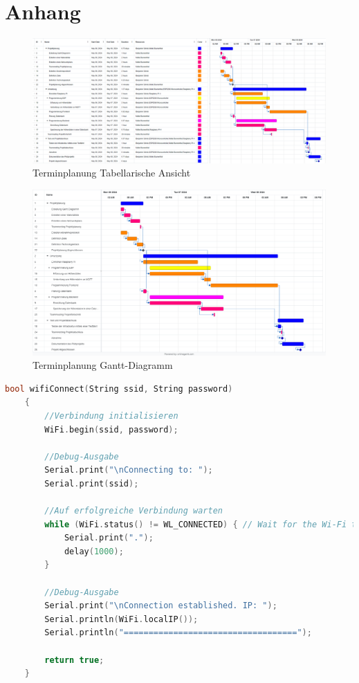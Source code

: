 \chapter{Anhang}

\begin{figure} [H]
	\centering
	\includegraphics[width=15cm]{images/Zeitplanung.png}
	\caption[Terminplanung Tabellarisch]{Terminplanung Tabellarische Ansicht}
	\label{fig:terminplanung_tabellarisch}
\end{figure}

\begin{figure} [H]
	\centering
	\includegraphics[width=15cm]{images/Gantt.png}
	\caption[Terminplanung Gantt]{Terminplanung Gantt-Diagramm}
	\label{fig:terminplanung_gantt}
\end{figure}

\begin{lstlisting}[language=C++,caption={WiFi connect}, label=lst:wificonnect]
	bool wifiConnect(String ssid, String password)
	{
		//Verbindung initialisieren
		WiFi.begin(ssid, password);
		
		//Debug-Ausgabe
		Serial.print("\nConnecting to: ");
		Serial.print(ssid);
		
		//Auf erfolgreiche Verbindung warten
		while (WiFi.status() != WL_CONNECTED) { // Wait for the Wi-Fi to connect
			Serial.print(".");
			delay(1000);
		}
		
		//Debug-Ausgabe
		Serial.print("\nConnection established. IP: ");
		Serial.println(WiFi.localIP());
		Serial.println("===================================");
		
		return true;
	}
\end{lstlisting}

